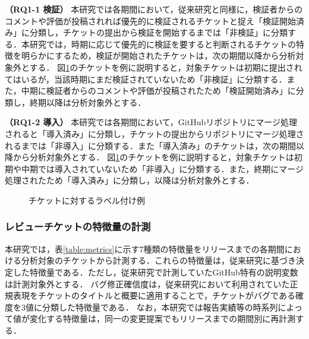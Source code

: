 \documentclass[T,J]{fose} %
\begin{document}
\textbf{（RQ1-1 検証）} 本研究では各期間において，従来研究\cite{prioritizer}と同様に，検証者からのコメントや評価が投稿されれば優先的に検証されるチケットと捉え「検証開始済み」に分類し，チケットの提出から検証を開始するまでは「非検証」に分類する．本研究では，時期に応じて優先的に検証を要すると判断されるチケットの特徴を明らかにするため，検証が開始されたチケットは，次の期間以降から分析対象外とする．
図\ref{fig:labeling}のチケットを例に説明すると，対象チケットは初期に提出されてはいるが，当該時期にまだ検証されていないため「非検証」に分類する．また，中期に検証者からのコメントや評価が投稿されたため「検証開始済み」に分類し，終期以降は分析対象外とする．

\textbf{（RQ1-2 導入）} 本研究では各期間において，GitHubリポジトリにマージ処理されると「導入済み」に分類し，チケットの提出からリポジトリにマージ処理されるまでは「非導入」に分類する．また「導入済み」のチケットは，次の期間以降から分析対象外とする．
図\ref{fig:labeling}のチケットを例に説明すると，対象チケットは初期や中期では導入されていないため「非導入」に分類する．また，終期にマージ処理されたため「導入済み」に分類し，以降は分析対象外とする．

\begin{figure}[t]
\begin{center}
\caption{チケットに対するラベル付け例}
\label{fig:labeling}
\end{center}
\end{figure}


\subsubsection{レビューチケットの特徴量の計測}
本研究では，表\ref{table:metrics}に示す7種類の特徴量をリリースまでの各期間における分析対象のチケットから計測する．これらの特徴量は，従来研究に基づき決定した特徴量である．ただし，従来研究で計測していたGitHub特有の説明変数は計測対象外とする．
バグ修正確信度は，従来研究\cite{bug}において利用されていた正規表現をチケットのタイトルと概要に適用することで，チケットがバグである確度を3値に分類した特徴量である．
なお，本研究では報告実績等の時系列によって値が変化する特徴量は，同一の変更提案でもリリースまでの期間別に再計測する．
\end{document}
